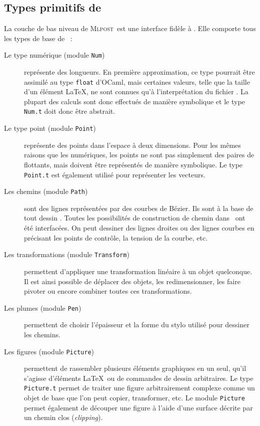 \documentclass[twoside]{studia-Hermann}
\newcommand{\ocaml}{OCaml}
\newcommand{\mlpost}{\textsc{Mlpost}}
\newcommand{\metapost}{\MP}
\begin{document}
\subsection{Types primitifs de \metapost}\label{subsec:types}

La couche de bas niveau de \mlpost\ est une interface fidèle à \metapost. Elle
comporte tous les types de base de \metapost~:

\begin{description}

  \item[Le type numérique (module \texttt{Num})] représente des longueurs.
    En première approximation, ce type pourrait être assimilé au type
    \texttt{float} d'\ocaml, 
    mais certaines valeurs, telle que  la taille d'un élément \LaTeX, ne sont
    connues qu'à l'interprétation du fichier \metapost.  La plupart des
    calculs sont donc effectués de 
    manière symbolique et le type \texttt{Num.t} doit donc être abstrait.

  \item[Le type point (module \texttt{Point})] représente des points
    dans l'espace à deux dimensions. Pour les mêmes raisons que les
    numériques, les points ne sont pas simplement des paires de flottants, mais
    doivent être représentés de manière symbolique. Le type
    \texttt{Point.t} est également utilisé pour représenter les vecteurs.

  \item[Les chemins (module \texttt{Path})] sont des lignes représentées par
    des courbes de Bézier. Ils sont à la base de tout dessin \metapost. Toutes
    les possibilités de construction de chemin dans \metapost\ ont été
    interfacées. On peut dessiner des lignes droites ou des lignes courbes en
    précisant les points de contrôle, la tension de la courbe, etc.
    
  \item[Les transformations (module \texttt{Transform})] permettent
    d'appliquer une transformation linéaire à un objet quelconque. Il est
    ainsi possible de déplacer des objets, les redimensionner,
    les faire pivoter ou encore combiner toutes ces transformations.

  \item[Les plumes (module \texttt{Pen})] permettent de choisir 
    l'épaisseur et la forme du stylo utilisé pour dessiner les
    chemins.

  \item[Les figures (module \texttt{Picture})] permettent de
    rassembler plusieurs éléments graphiques en un seul, qu'il
    s'agisse d'éléments \LaTeX\ ou de commandes de dessin arbitraires.
    Le type \texttt{Picture.t} permet de traiter
    une figure arbitrairement complexe comme un objet de base que l'on
    peut copier, transformer, etc.
    Le module \texttt{Picture} permet également de découper une figure
    à l'aide d'une surface décrite par un chemin clos
    (\textit{clipping}). 

\end{description}
\end{document}
